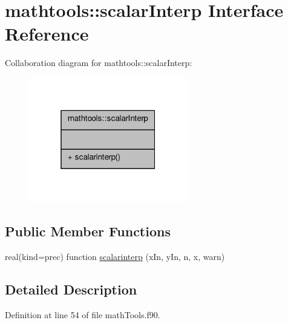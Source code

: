 \hypertarget{interfacemathtools_1_1scalar_interp}{\section{mathtools\-:\-:scalar\-Interp Interface Reference}
\label{interfacemathtools_1_1scalar_interp}
}


Collaboration diagram for mathtools\-:\-:scalar\-Interp\-:
\nopagebreak
\begin{figure}[H]
\begin{center}
\leavevmode
\includegraphics[width=196pt]{interfacemathtools_1_1scalar_interp__coll__graph}
\end{center}
\end{figure}
\subsection*{Public Member Functions}
\begin{DoxyCompactItemize}
\item 
real(kind=prec) function \hyperlink{interfacemathtools_1_1scalar_interp_afaf1b0ca0fbc382c577e441affcd2e77}{scalarinterp} (x\-In, y\-In, n, x, warn)
\end{DoxyCompactItemize}


\subsection{Detailed Description}


Definition at line 54 of file math\-Tools.\-f90.



